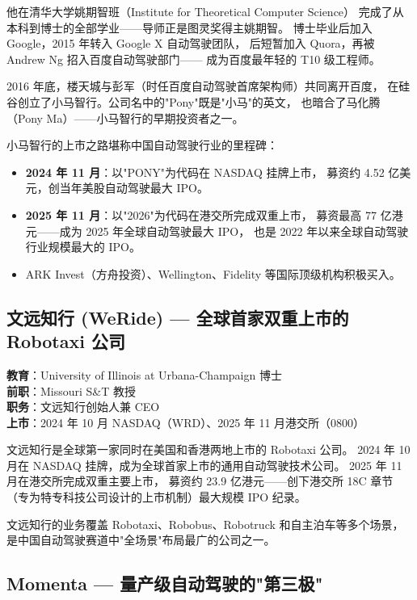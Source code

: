 他在清华大学姚期智班（Institute for Theoretical Computer Science）
完成了从本科到博士的全部学业——导师正是图灵奖得主姚期智。
博士毕业后加入 Google，2015 年转入 Google X 自动驾驶团队，
后短暂加入 Quora，再被 Andrew Ng 招入百度自动驾驶部门——
成为百度最年轻的 T10 级工程师。

2016 年底，楼天城与彭军（时任百度自动驾驶首席架构师）共同离开百度，
在硅谷创立了小马智行。公司名中的"Pony"既是"小马"的英文，
也暗合了马化腾（Pony Ma）——小马智行的早期投资者之一。

小马智行的上市之路堪称中国自动驾驶行业的里程碑：
\begin{itemize}[noitemsep]
  \item \textbf{2024 年 11 月}：以"PONY"为代码在 NASDAQ 挂牌上市，
        募资约 4.52 亿美元，创当年美股自动驾驶最大 IPO。
  \item \textbf{2025 年 11 月}：以"2026"为代码在港交所完成双重上市，
        募资最高 77 亿港元——成为 2025 年全球自动驾驶最大 IPO，
        也是 2022 年以来全球自动驾驶行业规模最大的 IPO。
  \item ARK Invest（方舟投资）、Wellington、Fidelity 等国际顶级机构积极买入。
\end{itemize}


\subsection{文远知行 (WeRide) — 全球首家双重上市的 Robotaxi 公司}

\begin{keybox}
\textbf{教育}：University of Illinois at Urbana-Champaign 博士 \\
\textbf{前职}：Missouri S\&T 教授 \\
\textbf{职务}：文远知行创始人兼 CEO \\
\textbf{上市}：2024 年 10 月 NASDAQ（WRD）、2025 年 11 月港交所（0800）
\end{keybox}

文远知行是全球第一家同时在美国和香港两地上市的 Robotaxi 公司。
2024 年 10 月在 NASDAQ 挂牌，成为全球首家上市的通用自动驾驶技术公司。
2025 年 11 月在港交所完成双重主要上市，
募资约 23.9 亿港元——创下港交所 18C 章节
（专为特专科技公司设计的上市机制）最大规模 IPO 纪录。

文远知行的业务覆盖 Robotaxi、Robobus、Robotruck 和自主泊车等多个场景，
是中国自动驾驶赛道中"全场景"布局最广的公司之一。


\subsection{Momenta — 量产级自动驾驶的"第三极"}

